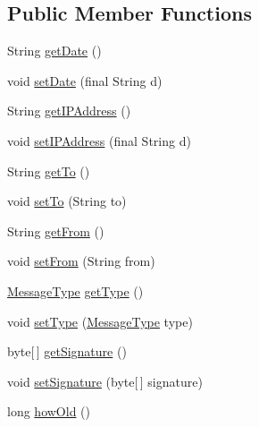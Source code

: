 \subsection*{Public Member Functions}
\begin{DoxyCompactItemize}
\item 
String \hyperlink{classgov_1_1fnal_1_1ppd_1_1dd_1_1xml_1_1EnhancedEncodedCarrier_a1cc11e605f367e3384850f545e14a1ba}{get\-Date} ()
\item 
void \hyperlink{classgov_1_1fnal_1_1ppd_1_1dd_1_1xml_1_1EnhancedEncodedCarrier_a17e05c36bf0dc860c0e56e68a5c6c4c8}{set\-Date} (final String d)
\item 
String \hyperlink{classgov_1_1fnal_1_1ppd_1_1dd_1_1xml_1_1EnhancedEncodedCarrier_a7632757fe102558d73e2f4e4b1d26686}{get\-I\-P\-Address} ()
\item 
void \hyperlink{classgov_1_1fnal_1_1ppd_1_1dd_1_1xml_1_1EnhancedEncodedCarrier_a060de33c20a66c4eb122550718f6cfd4}{set\-I\-P\-Address} (final String d)
\item 
String \hyperlink{classgov_1_1fnal_1_1ppd_1_1dd_1_1xml_1_1EnhancedEncodedCarrier_acb290c2eca9e9a4de0b7b6c97bca8b94}{get\-To} ()
\item 
void \hyperlink{classgov_1_1fnal_1_1ppd_1_1dd_1_1xml_1_1EnhancedEncodedCarrier_a35332fe9af9aca933e7063bf6b1a4ae8}{set\-To} (String to)
\item 
String \hyperlink{classgov_1_1fnal_1_1ppd_1_1dd_1_1xml_1_1EnhancedEncodedCarrier_ad124a55126e3305167ac14d81179893c}{get\-From} ()
\item 
void \hyperlink{classgov_1_1fnal_1_1ppd_1_1dd_1_1xml_1_1EnhancedEncodedCarrier_acd8d142dc4806cf2a1e907ea050de506}{set\-From} (String from)
\item 
\hyperlink{enumgov_1_1fnal_1_1ppd_1_1dd_1_1chat_1_1MessageType}{Message\-Type} \hyperlink{classgov_1_1fnal_1_1ppd_1_1dd_1_1xml_1_1EnhancedEncodedCarrier_aec4dc2ddee4e939b21e85238ea7de5f9}{get\-Type} ()
\item 
void \hyperlink{classgov_1_1fnal_1_1ppd_1_1dd_1_1xml_1_1EnhancedEncodedCarrier_a50ef3a3372a7642a77ce95a3d6f78b94}{set\-Type} (\hyperlink{enumgov_1_1fnal_1_1ppd_1_1dd_1_1chat_1_1MessageType}{Message\-Type} type)
\item 
byte\mbox{[}$\,$\mbox{]} \hyperlink{classgov_1_1fnal_1_1ppd_1_1dd_1_1xml_1_1EnhancedEncodedCarrier_a37fbd3b5dc6c3e7e5e30e65d451b3222}{get\-Signature} ()
\item 
void \hyperlink{classgov_1_1fnal_1_1ppd_1_1dd_1_1xml_1_1EnhancedEncodedCarrier_a77d7f6acee6ff3755dd9788011e1924a}{set\-Signature} (byte\mbox{[}$\,$\mbox{]} signature)
\item 
long \hyperlink{classgov_1_1fnal_1_1ppd_1_1dd_1_1xml_1_1EnhancedEncodedCarrier_ae33b7b407bf0936c891f68361228515f}{how\-Old} ()
\end{DoxyCompactItemize}

